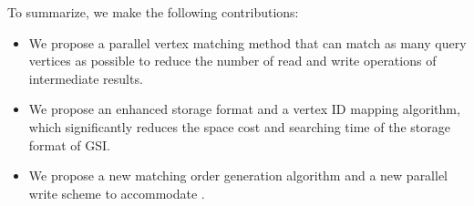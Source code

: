  To summarize, we make the following contributions:
 \begin{itemize}
    \item We propose a parallel vertex matching method that can match as many query vertices as possible to reduce the number of read and write operations of intermediate results.
    \item We propose an enhanced storage format and a vertex ID mapping algorithm, which significantly reduces the space cost and searching time of the storage format of GSI.
    \item We propose a new matching order generation algorithm and a new parallel write scheme to accommodate \SystemName.
\end{itemize}
